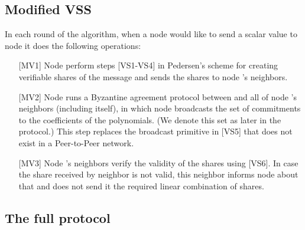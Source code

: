 \documentclass[10pt]{svjour3}
\begin{document}
\subsection{Modified VSS}
In each round of the algorithm, when a node  would like to send
a scalar value  to node  it does the following operations:
\begin{itemize}
\item [{[MV1]}] Node  perform steps [VS1-VS4] in Pedersen's
scheme for creating verifiable shares of the message  and
sends the shares to node 's neighbors.

\item [{[MV2]}] Node  runs a Byzantine agreement protocol
  between  and all of node 's neighbors (including  itself), in which node 
  broadcasts the set  of commitments to the coefficients of
  the polynomials. (We denote
  this set as  later in the protocol.)  This step
  replaces the broadcast primitive in [VS5] that does not exist
  in a Peer-to-Peer network.

\item [{[MV3]}] Node 's neighbors verify the validity of the shares
using [VS6]. In case the share received by neighbor  is not valid,
this neighbor informs node  about that and does not send it the
required linear combination of shares.
\end{itemize}



\subsection{The full protocol}
\end{document}
